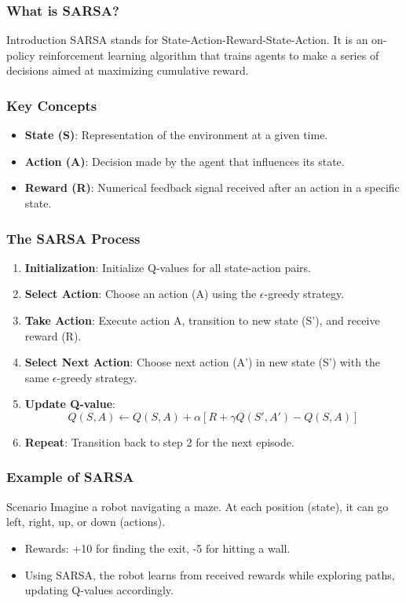 \documentclass{beamer}
\begin{document}
\begin{frame}[fragile]
    \frametitle{What is SARSA?}
    \begin{block}{Introduction}
        SARSA stands for State-Action-Reward-State-Action. It is an on-policy reinforcement learning algorithm that trains agents to make a series of decisions aimed at maximizing cumulative reward.
    \end{block}
\end{frame}

\begin{frame}[fragile]
    \frametitle{Key Concepts}
    \begin{itemize}
        \item \textbf{State (S)}: Representation of the environment at a given time.
        \item \textbf{Action (A)}: Decision made by the agent that influences its state.
        \item \textbf{Reward (R)}: Numerical feedback signal received after an action in a specific state.
    \end{itemize}
\end{frame}

\begin{frame}[fragile]
    \frametitle{The SARSA Process}
    \begin{enumerate}
        \item \textbf{Initialization}: Initialize Q-values for all state-action pairs.
        \item \textbf{Select Action}: Choose an action (A) using the $\epsilon$-greedy strategy.
        \item \textbf{Take Action}: Execute action A, transition to new state (S'), and receive reward (R).
        \item \textbf{Select Next Action}: Choose next action (A') in new state (S') with the same $\epsilon$-greedy strategy.
        \item \textbf{Update Q-value}:
        \begin{equation}
            Q(S, A) \leftarrow Q(S, A) + \alpha \left[ R + \gamma Q(S', A') - Q(S, A) \right]
        \end{equation}
        \item \textbf{Repeat}: Transition back to step 2 for the next episode.
    \end{enumerate}
\end{frame}

\begin{frame}[fragile]
    \frametitle{Example of SARSA}
    \begin{block}{Scenario}
        Imagine a robot navigating a maze. At each position (state), it can go left, right, up, or down (actions). 
    \end{block}
    \begin{itemize}
        \item Rewards: +10 for finding the exit, -5 for hitting a wall.
        \item Using SARSA, the robot learns from received rewards while exploring paths, updating Q-values accordingly.
    \end{itemize}
\end{frame}
\end{document}
